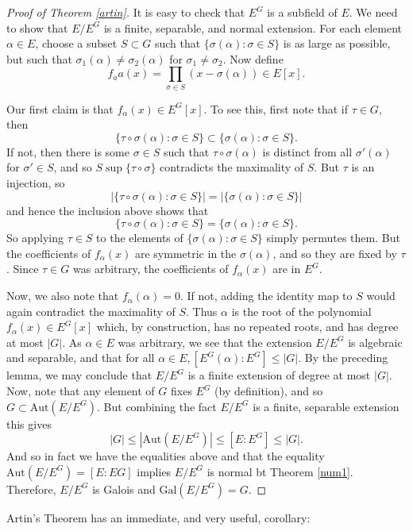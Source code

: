 \documentclass[12pt]{report}
\theoremstyle{definition}
\def\Aut{\text{Aut}}
\def\aa{\alpha}
\def\Gal{\text{Gal}}
\begin{document}
\begin{proof}[Proof of Theorem \ref{artin}]
    It is easy to check that $E^G$ is a subfield of $E$. We need to show that $E/E^G$ is a finite, separable, and normal extension. For each element $\aa \in E$, choose a subset $S \subset G$ such that $\{\sigma(\aa): \sigma\in S\}$ is as large as possible, but such that $\sigma_1(\aa) \not= \sigma_2(\aa)$ for $\sigma_1\not=\sigma_2$.
    Now define $$f_aa(x) =\prod_{\sigma\in S}(x-\sigma(\aa)) \in E[x].$$
    
    Our first claim is that $f_\aa(x) \in E^G[x]$.
    To see this, first note that if $\tau \in G$, then
    $$\{\tau\circ\sigma(\aa):\sigma\in S\}\subset \{\sigma(\aa): \sigma\in S\}.$$
    If not, then there is some $\sigma \in S$ such that $\tau \circ \sigma(\aa)$ is distinct from all $\sigma'(\aa)$ for $\sigma' \in S$, and so $S\sup \{ \tau\circ \sigma \}$ contradicts the maximality of $S$. But $\tau$ is an injection, so $$|\{\tau\circ\sigma(\aa):\sigma\in S\}|=|\{\sigma(\aa): \sigma\in S\}|$$ and hence the inclusion above shows that $$\{\tau\circ\sigma(\aa):\sigma\in S\} = \{\sigma(\aa): \sigma\in S\}.$$
    So applying $\tau \in S$ to the elements of $\{\sigma(\aa): \sigma\in S\}$ simply permutes them. But the coefficients of $f_\aa(x)$ are symmetric in the $\sigma(\aa)$, and so they are fixed by $\tau$. Since $\tau \in G$ was arbitrary, the coefficients of $f_\aa(x)$ are in $E^G$.

    Now, we also note that $f_\aa(\aa) = 0$. If not, adding the identity map to $S$ would again contradict the maximality of $S$. Thus $\aa$ is the root of the polynomial $f_\aa(x) \in E^G[x]$ which, by construction, has no repeated roots, and has degree at most $|G|$. As $\aa \in E$ was arbitrary, we see that the extension $E/E^G$ is algebraic and separable, and that for all $\aa \in E, [E^G(\aa) : E^G] \leq |G|$. By the preceding lemma, we may conclude that $E/E^G$ is a finite extension of degree at most $|G|$. Now, note that any element of $G$ fixes $E^G$ (by definition), and so $G \subset \Aut(E/E^G)$. But combining the fact $E/E^G$ is a finite, separable extension this gives $$|G| \leq |\Aut(E/E^G)| \leq [E:E^G] \leq |G|.$$ 
    And so in fact we have the equalities above and that the equality $\Aut(E/E^G) = [E : EG]$ implies $E/E^G$ is normal bt Theorem \ref{num1}. Therefore, $E/E^G$ is Galois and $\Gal(E/E^G) = G$.
\end{proof}

Artin's Theorem has an immediate, and very useful, corollary:
\end{document}
